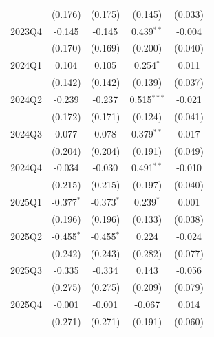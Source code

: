 \begin{table}[htbp]
\begin{tabular}{lcccc}
 & (0.176) & (0.175) & (0.145) & (0.033) \\
2023Q4 & -0.145 & -0.145 & 0.439$^{**}$ & -0.004 \\
 & (0.170) & (0.169) & (0.200) & (0.040) \\
2024Q1 & 0.104 & 0.105 & 0.254$^{*}$ & 0.011 \\
 & (0.142) & (0.142) & (0.139) & (0.037) \\
2024Q2 & -0.239 & -0.237 & 0.515$^{***}$ & -0.021 \\
 & (0.172) & (0.171) & (0.124) & (0.041) \\
2024Q3 & 0.077 & 0.078 & 0.379$^{**}$ & 0.017 \\
 & (0.204) & (0.204) & (0.191) & (0.049) \\
2024Q4 & -0.034 & -0.030 & 0.491$^{**}$ & -0.010 \\
 & (0.215) & (0.215) & (0.197) & (0.040) \\
2025Q1 & -0.377$^{*}$ & -0.373$^{*}$ & 0.239$^{*}$ & 0.001 \\
 & (0.196) & (0.196) & (0.133) & (0.038) \\
2025Q2 & -0.455$^{*}$ & -0.455$^{*}$ & 0.224 & -0.024 \\
 & (0.242) & (0.243) & (0.282) & (0.077) \\
2025Q3 & -0.335 & -0.334 & 0.143 & -0.056 \\
 & (0.275) & (0.275) & (0.209) & (0.079) \\
2025Q4 & -0.001 & -0.001 & -0.067 & 0.014 \\
 & (0.271) & (0.271) & (0.191) & (0.060) \\
\bottomrule
\end{tabular}
\par\vspace{2pt}{\footnotesize Reference quarter 2022Q3 omitted. Standard errors clustered on occupation in parentheses. * p<0.10, ** p<0.05, *** p<0.01.}
\end{table}
